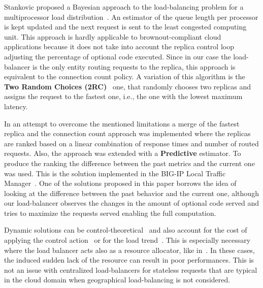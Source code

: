 Stankovic proposed a Bayesian approach to the load-balancing problem
for a multiprocessor load distribution~\cite{Stankovic:TC}. An
estimator of the queue length per processor is kept updated and the
next request is sent to the least congested computing unit. This
approach is hardly applicable to brownout-compliant cloud applications
because it does not take into account the replica control loop
adjusting the percentage of optional code executed. Since in our case
the load-balancer is the only entity routing requests to the replica,
this approach is equivalent to the connection count policy. A
variation of this algorithm is the \textbf{Two Random Choices
  (2RC)}~\cite{2RC} one, that randomly chooses two replicas and
assigns the request to the fastest one, i.e., the one with the lowest
maximum latency.

In an attempt to overcome the mentioned limitations a merge of the
fastest replica and the connection count approach was implemented
where the replicas are ranked based on a linear combination of
response times and number of routed requests. Also, the approach was
extended with a \textbf{Predictive} estimator. To produce the ranking
the difference between the past metrics and the current one was
used. This is the solution implemented in the BIG-IP Local Traffic
Manager~\cite{BIGIP}. One of the solutions proposed in this paper
borrows the idea of looking at the difference between the past
behavior and the current one, although our load-balancer observes the
changes in the amount of optional code served and tries to maximize
the requests served enabling the full computation.

Dynamic solutions can be
control-theoretical~\cite{multipathctlb,comparisonstaticdynamic} and
also account for the cost of applying the control
action~\cite{costofcontrol} or for the load trend~\cite{CasolariSA}.
This is especially necessary where the load balancer acts also as a
resource allocator, like in~\cite{Ardagnaalltogether}. In these cases,
the induced sudden lack of the resource can result in poor
performances. This is not an issue with centralized load-balancers for
stateless requests that are typical in the cloud domain when
geographical load-balancing is not considered.

